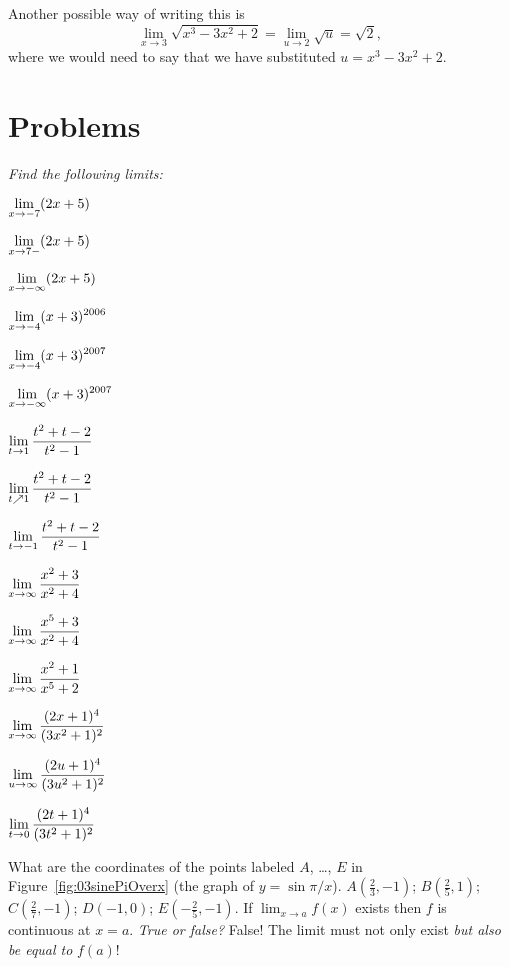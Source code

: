Another possible way of writing this is
\[
\lim_{x\to3}\sqrt{x^3 - 3x^2 + 2} =\lim_{u\to 2}\sqrt u =\sqrt2,
\]
where we would need to say that we have substituted $u=x^3-3x^2+2$.

\section{Problems} 
\problemfont 
\textit{Find the following limits:}\\
\begin{multicols}{3}\setlength{\parindent}{0pt}

\problem $\displaystyle \lim_{x\to -7}(2x+5) $ 

\problem $\displaystyle \lim_{x\to 7-}(2x+5) $ 

\problem $\displaystyle \lim_{x\to -\infty}(2x+5) $ 

\problem $\displaystyle \lim_{x\to-4} (x+3)^{2006} $ 

\problem $\displaystyle \lim_{x\to-4} (x+3)^{2007} $ 

\problem $\displaystyle \lim_{x\to-\infty} (x+3)^{2007}$ 

\problem $\displaystyle \lim_{t\to1}\frac{t^2+t-2}{t^2-1} $ 

\problem $\displaystyle \lim_{t\nearrow1}\frac{t^2+t-2}{t^2-1} $ 

\problem $\displaystyle \lim_{t\to-1}\frac{t^2+t-2}{t^2-1} $ 

\problem $\displaystyle \lim_{x\to\infty}\frac{x^2+3}{x^2+4} $ 

\problem $\displaystyle \lim_{x\to\infty}\frac{x^5+3}{x^2+4} $ 

\problem $\displaystyle \lim_{x\to\infty}\frac{x^2+1}{x^5+2} $ 

\problem $\displaystyle \lim_{x\to\infty} \frac{(2x+1)^4}{ (3x^2+1)^2} $ 

\problem $\displaystyle \lim_{u\to\infty} \frac{(2u+1)^4}{ (3u^2+1)^2} $ 

\problem $\displaystyle \lim_{t\to0} \frac{(2t+1)^4}{ (3t^2+1)^2}$ 
\end{multicols}
\problem What are the coordinates of the points labeled $A$, \ldots, $E$ in 
Figure~\ref{fig:03sinePiOverx} (the graph of $y=\sin\pi/x$).
\answer 
$A (\frac23,-1)$; $B (\frac25, 1)$; $C (\frac27,-1)$; $D(-1,0)$;
$E(-\frac25, -1)$.
\endanswer
\problem If $\lim_{x\to a} f(x)$ exists then $f$ is continuous at $x=a$. 
\textit{True or false?}
\answer 
False!  The limit must not only exist \textit{but also be equal to
}$f(a)$!
\endanswer

